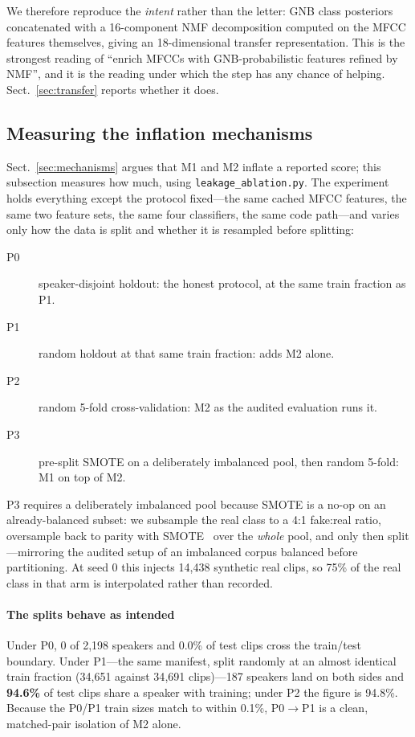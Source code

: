 \documentclass[sn-mathphys-num,pdflatex]{sn-jnl}
\begin{document}
We therefore reproduce the \emph{intent} rather than the letter: GNB class
posteriors concatenated with a 16-component NMF decomposition computed on the
MFCC features themselves, giving an 18-dimensional transfer representation. This
is the strongest reading of ``enrich MFCCs with GNB-probabilistic features
refined by NMF'', and it is the reading under which the step has any chance of
helping. Sect.~\ref{sec:transfer} reports whether it does.

\subsection{Measuring the inflation mechanisms}\label{sec:leakage}

Sect.~\ref{sec:mechanisms} argues that M1 and M2 inflate a reported score; this
subsection measures how much, using \texttt{leakage\_ablation.py}. The
experiment holds everything except the protocol fixed---the same cached MFCC
features, the same two feature sets, the same four classifiers, the same code
path---and varies only how the data is split and whether it is resampled before
splitting:

\begin{description}
\item[P0] speaker-disjoint holdout: the honest protocol, at the same train
fraction as P1.
\item[P1] random holdout at that same train fraction: adds M2 alone.
\item[P2] random 5-fold cross-validation: M2 as the audited evaluation runs it.
\item[P3] pre-split SMOTE on a deliberately imbalanced pool, then random 5-fold:
M1 on top of M2.
\end{description}

P3 requires a deliberately imbalanced pool because SMOTE is a no-op on an
already-balanced subset: we subsample the real class to a 4:1 fake:real ratio,
oversample back to parity with SMOTE~\cite{smote} over the \emph{whole} pool,
and only then split---mirroring the audited setup of an imbalanced corpus
balanced before partitioning. At seed 0 this injects 14{,}438 synthetic real
clips, so 75\% of the real class in that arm is interpolated rather than
recorded.

\paragraph{The splits behave as intended}
Under P0, 0 of 2{,}198 speakers and 0.0\% of test clips cross the train/test
boundary. Under P1---the same manifest, split randomly at an almost identical
train fraction (34{,}651 against 34{,}691 clips)---187 speakers land on both
sides and \textbf{94.6\%} of test clips share a speaker with training; under P2
the figure is 94.8\%. Because the P0/P1 train sizes match to within 0.1\%,
P0$\to$P1 is a clean, matched-pair isolation of M2 alone.
\end{document}
